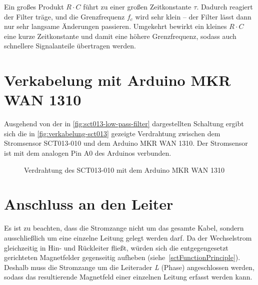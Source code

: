 	Ein gro{\ss}es Produkt \(R \cdot C\) führt zu einer gro{\ss}en Zeitkonstante \(\tau\). Dadurch reagiert der Filter träge, und die Grenzfrequenz \(f_c\) wird sehr klein – der Filter lässt dann nur sehr langsame Änderungen passieren. Umgekehrt bewirkt ein kleines \(R \cdot C\) eine kurze Zeitkonstante und damit eine höhere Grenzfrequenz, sodass auch schnellere Signalanteile übertragen werden.
	
		
	
	
\section{Verkabelung mit Arduino MKR WAN 1310}
	Ausgehend von der in \autoref{fig:sct013-low-pass-filter} dargestellten Schaltung ergibt sich die in \autoref{fig:verkabelung-sct013} gezeigte Verdrahtung zwischen dem Stromsensor SCT013-010 und dem Arduino MKR WAN 1310. Der Stromsensor ist mit dem analogen Pin A0 des Arduinos verbunden.
	
	\begin{figure}[H]
		\centering
		\caption{Verdrahtung des SCT013-010 mit dem Arduino MKR WAN 1310}
		\label{fig:verkabelung-sct013}
		
	\end{figure}

\section{Anschluss an den Leiter}
	Es ist zu beachten, dass die Stromzange nicht um das gesamte Kabel, sondern ausschlie{\ss}lich um eine einzelne Leitung gelegt werden darf. Da der Wechselstrom gleichzeitig in Hin- und Rückleiter flie{\ss}t, würden sich die entgegengesetzt gerichteten Magnetfelder gegenseitig aufheben (siehe~\autoref{sctFunctionPrinciple}). Deshalb muss die Stromzange um die Leiterader \emph{L} (Phase) angeschlossen werden, sodass das resultierende Magnetfeld einer einzelnen Leitung erfasst werden kann.

